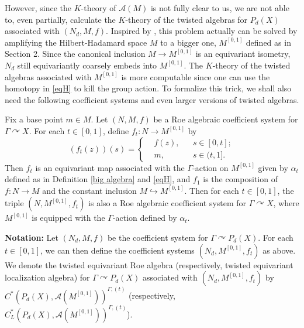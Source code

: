 \documentclass[11pt]{article}
\theoremstyle{definition}
\theoremstyle{plain}
\def\A{\mathcal A}\def\C{\mathcal C}\def\B{\mathcal B}\def\E{\mathcal E}\def\O{\mathcal O}\def\h{\mathfrak h}\def\K{\mathcal K}\def\F{\mathcal F}\def\P{\mathcal P}\def\L{\mathcal L}\def\R{\mathcal R}\def\Q{\mathcal Q}\def\H{\mathcal H}\def\S{\mathcal S}\def\N{\mathcal N}\def\U{\mathcal U}\def\V{\mathcal V}
\def\Ga{\Gamma}
\def\car{\curvearrowright}
\begin{document}
However, since the $K$-theory of $\A(M)$ is not fully clear to us, we are not able to, even partially, calculate the $K$-theory of the twisted algebras for $P_d(X)$ associated with $(N_d, M,f)$. Inspired by \cite{GWY2018}, this problem actually can be solved by amplifying the Hilbert-Hadamard space $M$ to a bigger one, $M^{[0,1]}$ defined as in Section 2. Since the canonical inclusion $M\to M^{[0,1]}$ is an equivariant isometry, $N_d$ still equivariantly coarsely embeds into $M^{[0,1]}$. The $K$-theory of the twisted algebras associated with $M^{[0,1]}$ is more computable since one can use the homotopy in \eqref{eqH} to kill the group action. To formalize this trick, we shall also need the following coefficient systems and even larger versions of twisted algebras. 

Fix a base point $m\in M$. Let $(N, M,f)$ be a Roe algebraic coefficient system for $\Ga\car X$. For each $t\in[0,1]$, define $f_t:N\to M^{[0,1]}$ by
\begin{equation}\label{eqf}
(f_t(z))(s)=\left\{\begin{aligned}&f(z),&&s\in[0,t];\\&m,&&s\in(t,1].\end{aligned}\right.
\end{equation}
Then $f_t$ is an equivariant map associated with the $\Ga$-action on $M^{[0,1]}$ given by $\alpha_t$ defined as in Definition \ref{big algebra} and \eqref{eqH}, and $f_1$ is the composition of $f:N\to M$ and the constant inclusion $M\hookrightarrow M^{[0,1]}$. Then for each $t\in[0,1]$, the triple $(N,M^{[0,1]},f_t)$ is also a Roe algebraic coefficient system for $\Ga\car X$, where $M^{[0,1]}$ is equipped with the $\Ga$-action defined by $\alpha_t$.

{\bf Notation:} Let $(N_d, M,f)$ be the coefficient system for $\Ga\car P_d(X)$. For each $t\in [0,1]$, we can then define the coefficient systems $(N_d, M^{[0,1]},f_t)$ as above. We denote the twisted equivariant Roe algebra (respectively, twisted equivariant localization algebra) for $\Ga\car P_d(X)$ associated with $(N_d, M^{[0,1]},f_t)$ by $C^*(P_d(X),\A(M^{[0,1]}))^{\Ga,(t)}$ (respectively, $C^*_L(P_d(X),\A(M^{[0,1]}))^{\Ga,(t)}$).
\end{document}
